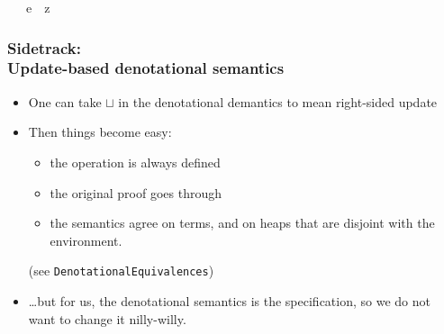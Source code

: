 \documentclass{beamer}
\begin{document}
\begin{frame}
\begin{itemize}
\begin{isabelle}
\ \ \ {\isachardoublequoteopen}{\isasymlbrakk}e{\isasymrbrakk}\isactrlbsub {\isasymlbrace}{\isasymGamma}{\isasymrbrace}\isactrlesub \ {\isacharequal}\ {\isasymlbrakk}z{\isasymrbrakk}\isactrlbsub {\isasymlbrace}{\isasymDelta}{\isasymrbrace}\isactrlesub {\isachardoublequoteclose}\ \ {\isachardoublequoteopen}{\isasymlbrace}{\isasymGamma}{\isasymrbrace}\ {\isasymle}\ {\isasymlbrace}{\isasymDelta}{\isasymrbrace}{\isachardoublequoteclose}
\end{isabelle}
\end{itemize}
\end{frame}

\begin{frame}
\frametitle{Sidetrack:\\ Update-based denotational semantics}

\begin{itemize}
\item One can take $\sqcup$ in the denotational demantics to mean right-sided update
\item Then things become easy:
\begin{itemize}
\item the operation is always defined
\item the original proof goes through
\item the semantics agree on terms, and on heaps that are disjoint with the environment.
\end{itemize}
(see \texttt{DenotationalEquivalences})
\item \dots but for us, the denotational semantics is the specification, so we do not want to change it nilly-willy.
\end{itemize}
\end{frame}
\end{document}
